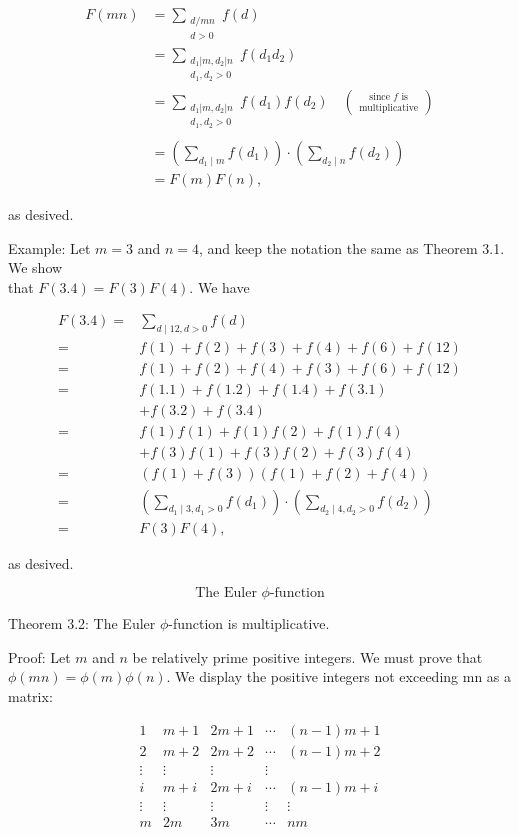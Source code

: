 \documentclass[10pt]{article}
\begin{document}
$$
\begin{aligned}
F(m n) & =\sum_{\substack{d / m n \\
d>0}} f(d) \\
& =\sum_{\substack{d_{1}\left|m, d_{2}\right| n \\
d_{1}, d_{2}>0}} f\left(d_{1} d_{2}\right) \\
& =\sum_{\substack{d_{1}\left|m, d_{2}\right| n \\
d_{1}, d_{2}>0\\
}} f\left(d_{1}\right) f\left(d_{2}\right) \quad\binom{\text { since } f \text { is }}{\text { multiplicative }} \\
& =\left(\sum_{d_{1} \mid m} f\left(d_{1}\right)\right) \cdot\left(\sum_{d_{2} \mid n} f\left(d_{2}\right)\right) \\
& =F(m) F(n),
\end{aligned}
$$

as desived.

Example: Let $m=3$ and $n=4$, and keep the notation the same as Theorem 3.1. We show\\
that $F(3.4)=F(3) F(4)$. We have

$$
\begin{aligned}
F(3.4)= & \sum_{d \mid 12, d>0} f(d) \\
= & f(1)+f(2)+f(3)+f(4)+f(6)+f(12) \\
= & f(1)+f(2)+f(4)+f(3)+f(6)+f(12) \\
= & f(1.1)+f(1.2)+f(1.4)+f(3.1) \\
& +f(3.2)+f(3.4) \\
= & f(1) f(1)+f(1) f(2)+f(1) f(4) \\
& +f(3) f(1)+f(3) f(2)+f(3) f(4) \\
= & (f(1)+f(3))(f(1)+f(2)+f(4)) \\
= & \left(\sum_{d_{1} \mid 3, d_{1}>0} f\left(d_{1}\right)\right) \cdot\left(\sum_{d_{2} \mid 4, d_{2}>0} f\left(d_{2}\right)\right) \\
= & F(3) F(4),
\end{aligned}
$$

as desived.

$$
\text { The Euler } \phi \text {-function }
$$

Theorem 3.2: The Euler $\phi$-function is multiplicative.

Proof: Let $m$ and $n$ be relatively prime positive integers. We must prove that $\phi(m n)=\phi(m) \phi(n)$. We display the positive integers not exceeding mn as a matrix:

$$
\begin{array}{ccccc}
1 & m+1 & 2 m+1 & \cdots & (n-1) m+1 \\
2 & m+2 & 2 m+2 & \cdots & (n-1) m+2 \\
\vdots & \vdots & \vdots & \vdots & \\
i & m+i & 2 m+i & \cdots & (n-1) m+i \\
\vdots & \vdots & \vdots & \vdots & \vdots \\
m & 2 m & 3 m & \cdots & n m
\end{array}
$$
\end{document}
